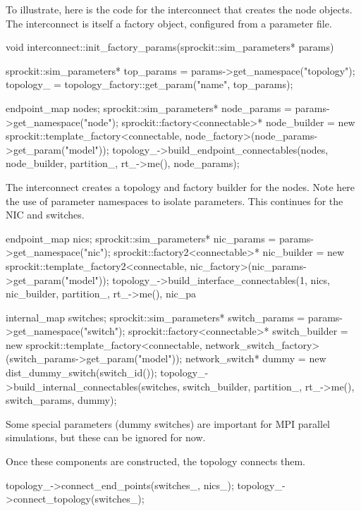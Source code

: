 To illustrate, here is the code for the interconnect that creates the node objects. 
The interconnect is itself a factory object, configured from a parameter file.

\begin{CppCode}
void
interconnect::init_factory_params(sprockit::sim_parameters* params)
{
  sprockit::sim_parameters* top_params = params->get_namespace("topology");
  topology_ = topology_factory::get_param("name", top_params);
  
  endpoint_map nodes;
  sprockit::sim_parameters* node_params = params->get_namespace("node");
  sprockit::factory<connectable>* node_builder
    = new sprockit::template_factory<connectable, node_factory>(node_params->get_param("model"));
  topology_->build_endpoint_connectables(nodes, node_builder, partition_, rt_->me(), node_params);
}
\end{CppCode}

The interconnect creates a topology and factory builder for the nodes.
Note here the use of parameter namespaces to isolate parameters.
This continues for the NIC and switches.

\begin{CppCode}
  endpoint_map nics;
  sprockit::sim_parameters* nic_params = params->get_namespace("nic");
  sprockit::factory2<connectable>* nic_builder
    = new sprockit::template_factory2<connectable, nic_factory>(nic_params->get_param("model"));
  topology_->build_interface_connectables(1, nics, nic_builder, partition_, rt_->me(), nic_pa
\end{CppCode}

\begin{CppCode}
  internal_map switches;
  sprockit::sim_parameters* switch_params = params->get_namespace("switch");
  sprockit::factory<connectable>* switch_builder
    = new sprockit::template_factory<connectable, network_switch_factory>(switch_params->get_param("model"));
  network_switch* dummy = new dist_dummy_switch(switch_id());
  topology_->build_internal_connectables(switches, switch_builder, partition_, rt_->me(), switch_params, dummy);
\end{CppCode}
Some special parameters (dummy switches) are important for MPI parallel simulations,
but these can be ignored for now.

Once these components are constructed, the topology connects them.
\begin{CppCode}
  topology_->connect_end_points(switches_, nics_);
  topology_->connect_topology(switches_);
\end{CppCode}

